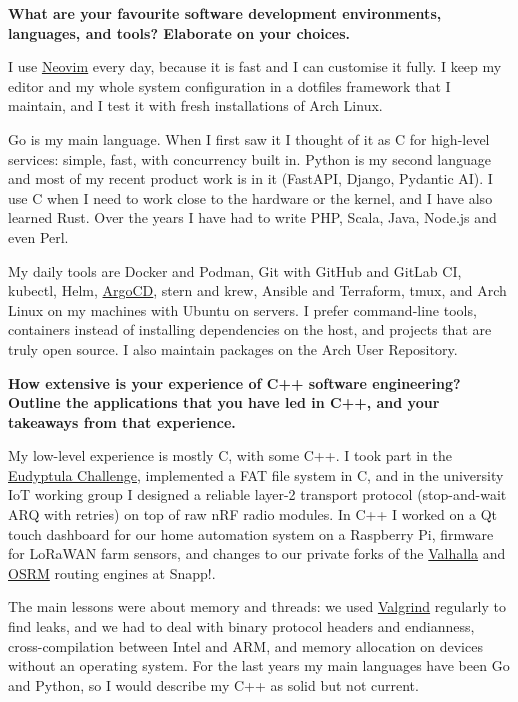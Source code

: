 \noindent
\textbf{What are your favourite software development environments, languages, and tools? Elaborate on your choices.}

I use \href{https://neovim.io/}{Neovim} every day, because it is fast and I can customise it fully. I keep my editor and my whole
system configuration in a dotfiles framework that I maintain, and I test it with fresh installations of Arch Linux.

Go is my main language. When I first saw it I thought of it as C for high-level services: simple, fast, with concurrency built in.
Python is my second language and most of my recent product work is in it (FastAPI, Django, Pydantic AI). I use C when I need to work
close to the hardware or the kernel, and I have also learned Rust. Over the years I have had to write PHP, Scala, Java, Node.js and even Perl.

My daily tools are Docker and Podman, Git with GitHub and GitLab CI, kubectl, Helm, \href{https://argo-cd.readthedocs.io/}{ArgoCD},
stern and krew, Ansible and Terraform, tmux, and Arch Linux on my machines with Ubuntu on servers. I prefer command-line tools, containers
instead of installing dependencies on the host, and projects that are truly open source. I also maintain packages on the Arch User Repository.

\noindent
\textbf{How extensive is your experience of C++ software engineering? Outline the applications that you have led in C++,
and your takeaways from that experience.}

My low-level experience is mostly C, with some C++. I took part in the \href{http://eudyptula-challenge.org/}{Eudyptula Challenge},
implemented a FAT file system in C, and in the university IoT working group I designed a reliable layer-2 transport protocol
(stop-and-wait ARQ with retries) on top of raw nRF radio modules. In C++ I worked on a Qt touch dashboard for our home automation
system on a Raspberry Pi, firmware for LoRaWAN farm sensors, and changes to our private forks of the
\href{https://github.com/valhalla/valhalla}{Valhalla} and \href{https://github.com/Project-OSRM/osrm-backend}{OSRM} routing engines at Snapp!.

The main lessons were about memory and threads: we used \href{https://valgrind.org/}{Valgrind} regularly to find leaks, and we had to deal with
binary protocol headers and endianness, cross-compilation between Intel and ARM, and memory allocation on devices without an operating system.
For the last years my main languages have been Go and Python, so I would describe my C++ as solid but not current.

